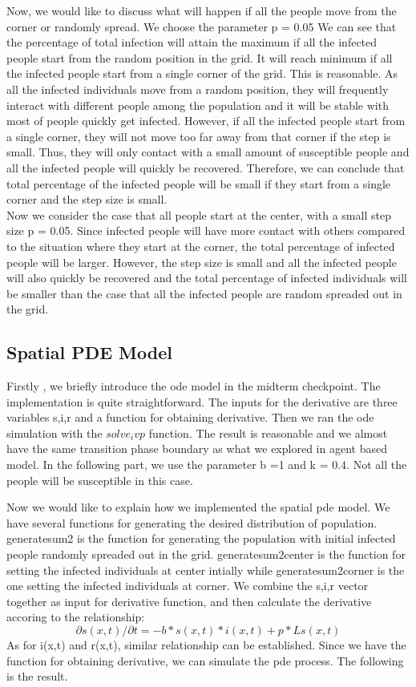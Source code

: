 \documentclass{article}
\begin{document}
Now, we would like to discuss what will happen if all the people move from the corner or randomly spread. We choose the parameter p = 0.05
We can see that the percentage of total infection will attain the maximum if all the infected people start from the random position in the grid. It will reach minimum if all the infected people start from a single corner of the grid. This is reasonable. As all the infected individuals move from a random position, they will frequently interact with different people among the population and it will be stable with most of people quickly get infected.
However, if all the infected people start from a single corner, they will not move too far away from that corner if the step is small. Thus, they will only contact with a small amount of susceptible people and all the infected people will quickly be recovered. Therefore, we can conclude that total percentage of the infected people will be small if they start from a single corner and the step size is small.\\
Now we consider the case that all people start at the center, with a small step size p = 0.05. Since infected people will have more contact with others compared to the situation where they start at the corner, the total percentage of infected people will be larger. However, the step size is small and all the infected people will also quickly be recovered and the total percentage of infected individuals will be smaller than the case that all the infected people are random spreaded out in the grid.

\subsection{Spatial PDE Model}
Firstly , we briefly introduce the ode model in the midterm checkpoint. The implementation is quite straightforward. The inputs for the derivative are three variables s,i,r and a function for obtaining derivative. Then we ran the ode simulation with the $solve_ivp$ function. The result is reasonable and we almost have the same transition phase boundary as what we explored in agent based model. In the following part, we use the parameter b =1 and k = 0.4. Not all the people will be susceptible in this case.

Now we would like to explain how we implemented the spatial pde model. We have several functions for generating the desired distribution of population. generatesum2 is the function for generating the population with initial infected people randomly spreaded out in the grid. generatesum2center is the function for setting the infected individuals at center intially while generatesum2corner is the one setting the infected individuals at corner. We combine the s,i,r vector together as input for derivative function, and then calculate the derivative accoring to the relationship:\\
$$\partial s(x,t)/\partial t = - b*s(x,t)*i(x,t) + p *L  s(x,t)$$
As for i(x,t) and r(x,t), similar relationship can be established. Since we have the function for obtaining derivative, we can simulate the pde process. The following is the result.
\end{document}
